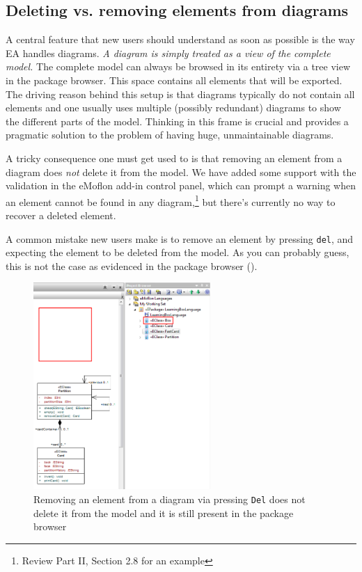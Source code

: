 \subsection{Deleting vs. removing elements from diagrams} 

A central feature that new users should understand as soon as possible is the way EA handles diagrams. \emph{A diagram is simply treated as a \emph{view} of the
complete model.} The complete model can always be browsed in its entirety via a tree view in the package browser. This space contains all elements that will be
exported. The driving reason behind this setup is that diagrams typically do not contain all elements and one usually uses multiple (possibly redundant)
diagrams to show the different parts of the model. Thinking in this frame is crucial and provides a pragmatic solution to the problem of having huge,
unmaintainable diagrams.

A tricky consequence one must get used to is that removing an element from a diagram does \emph{not} delete it from the model. We have added some support
with the validation in the eMoflon add-in control panel, which can prompt a warning when an element cannot be found in any diagram,\footnote{Review Part II,
Section 2.8 for an example} but there's currently no way to recover a deleted element.

A common mistake new users make is to remove an element by pressing \texttt{del}, and expecting the element to be deleted from the model. As you can probably
guess, this is not the case as evidenced in the package browser ().

\vspace{0.5cm}

\begin{figure}[htbp]
\begin{center} 
\includegraphics[width=0.6\textwidth]{ea_partiallyDeleted}
  \caption{Removing an element from a diagram via pressing \texttt{Del} does not delete it from the model and it is still present in the package browser}  
    \label{ea:partiallyDeleted}
\end{center}
\end{figure}  

